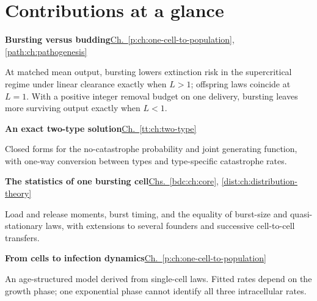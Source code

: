 \chapter*{Contributions at a glance}
\label{oi:summary-redesigned}
\begingroup
\setlength{\parindent}{0pt}
\setlength{\parskip}{0pt}
\newcommand{\oimapchapter}[2]{\hyperref[#1]{#2}}
\newcommand{\oimapentry}[3]{%
  \begin{minipage}{\linewidth}
    \textbf{#1}\hfill{\small #2}\par
    \vspace{3pt}
    {\small\raggedright #3\par}
  \end{minipage}\par\vspace{13pt}}

\oimapentry{Bursting versus budding}
  {\oimapchapter{p:ch:one-cell-to-population}{Ch.~\ref*{p:ch:one-cell-to-population}},
   \oimapchapter{path:ch:pathogenesis}{\ref*{path:ch:pathogenesis}}}
  {At matched mean output, bursting lowers extinction risk in the
   supercritical regime under linear clearance exactly when $L>1$;
   offspring laws coincide at $L=1$. With a positive integer removal
   budget on one delivery, bursting leaves more surviving output
   exactly when $L<1$.}

\oimapentry{An exact two-type solution}
  {\oimapchapter{tt:ch:two-type}{Ch.~\ref*{tt:ch:two-type}}}
  {Closed forms for the no-catastrophe probability and joint generating
   function, with one-way conversion between types and type-specific
   catastrophe rates.}

\oimapentry{The statistics of one bursting cell}
  {\oimapchapter{bdc:ch:core}{Chs.~\ref*{bdc:ch:core}},
   \oimapchapter{dist:ch:distribution-theory}{\ref*{dist:ch:distribution-theory}}}
  {Load and release moments, burst timing, and the equality of burst-size
   and quasi-stationary laws, with extensions to several founders and
   successive cell-to-cell transfers.}

\oimapentry{From cells to infection dynamics}
  {\oimapchapter{p:ch:one-cell-to-population}{Ch.~\ref*{p:ch:one-cell-to-population}}}
  {An age-structured model derived from single-cell laws. Fitted rates
   depend on the growth phase; one exponential phase cannot identify
   all three intracellular rates.}

